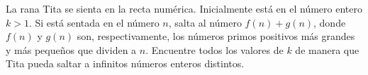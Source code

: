 La rana Tita se sienta en la recta numérica. Inicialmente está en el número entero $k>1$. Si está sentada en el número $n$, salta al número $f(n)+g(n)$, donde $f(n)$ y $g(n)$ son, respectivamente, los números primos positivos más grandes y más pequeños que dividen a $n$. Encuentre todos los valores de $k$ de manera que Tita pueda saltar a infinitos números enteros distintos.
